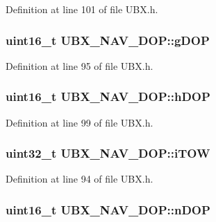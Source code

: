 \-Definition at line 101 of file \-U\-B\-X.\-h.

\hypertarget{struct_u_b_x___n_a_v___d_o_p_a2b2e6160322047b85f23f1cb527bc6fd}{
\subsubsection[{g\-D\-O\-P}]{\setlength{\rightskip}{0pt plus 5cm}uint16\-\_\-t {\bf \-U\-B\-X\-\_\-\-N\-A\-V\-\_\-\-D\-O\-P\-::g\-D\-O\-P}}}\label{struct_u_b_x___n_a_v___d_o_p_a2b2e6160322047b85f23f1cb527bc6fd}


\-Definition at line 95 of file \-U\-B\-X.\-h.

\hypertarget{struct_u_b_x___n_a_v___d_o_p_a04de37f3f6aaf991ce6435808faed53b}{
\subsubsection[{h\-D\-O\-P}]{\setlength{\rightskip}{0pt plus 5cm}uint16\-\_\-t {\bf \-U\-B\-X\-\_\-\-N\-A\-V\-\_\-\-D\-O\-P\-::h\-D\-O\-P}}}\label{struct_u_b_x___n_a_v___d_o_p_a04de37f3f6aaf991ce6435808faed53b}


\-Definition at line 99 of file \-U\-B\-X.\-h.

\hypertarget{struct_u_b_x___n_a_v___d_o_p_ae5ea4b23ed8d603c7360a18053975010}{
\subsubsection[{i\-T\-O\-W}]{\setlength{\rightskip}{0pt plus 5cm}uint32\-\_\-t {\bf \-U\-B\-X\-\_\-\-N\-A\-V\-\_\-\-D\-O\-P\-::i\-T\-O\-W}}}\label{struct_u_b_x___n_a_v___d_o_p_ae5ea4b23ed8d603c7360a18053975010}


\-Definition at line 94 of file \-U\-B\-X.\-h.

\hypertarget{struct_u_b_x___n_a_v___d_o_p_ae3287c2656c08835bdd2ffa7e28d0ee4}{
\subsubsection[{n\-D\-O\-P}]{\setlength{\rightskip}{0pt plus 5cm}uint16\-\_\-t {\bf \-U\-B\-X\-\_\-\-N\-A\-V\-\_\-\-D\-O\-P\-::n\-D\-O\-P}}}\label{struct_u_b_x___n_a_v___d_o_p_ae3287c2656c08835bdd2ffa7e28d0ee4}


